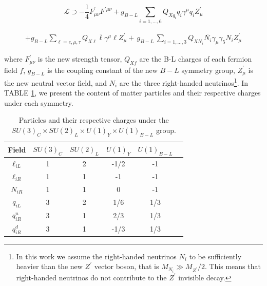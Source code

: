 \documentclass[aps,prev,twocolumn,preprintnumbers,floatfix,nofootinbib]{revtex4-1}
\renewcommand{\bar}{\overline}
\begin{document}
%

\begin{equation*}
    \mathcal{L}\supset -\frac{1}{4}{F}^{\prime}_{\mu\nu}{F}^{'\mu\nu} + {g}_{B-L}\sum_{i=1,...,6} {Q}_{X{q}_{i}} \overline{q_{i}} {\gamma}^{\mu} q_{i} {Z}^{\prime}_{\mu}
\end{equation*}

\begin{align}
 +{g}_{B-L}\sum_{\ell=e,\mu,\tau} {Q}_{X\ell} \overline{\ell} {\gamma}^{\mu} \ell {Z}^{\prime}_{\mu}  + \, g_{B-L}\,\sum_{i=1,...,3} {Q}_{X{N}_{i}} \bar{N_i} \gamma_\mu \gamma_5 N_i {Z}^{\prime}_{\mu}
    \label{relevant_lagrangian}    
\end{align}

\noindent where $F^{\prime}_{\mu\nu}$ is the new strength tensor, $Q_{Xf}$ are the B-L charges of each fermion field $f$, $g_{B-L}$ is the coupling constant of the new $B-L$ symmetry group, ${Z}^{\prime}_{\mu}$ is the new neutral vector field, and ${N}_{i}$ are the three right-handed neutrinos\footnote{In this work we assume the right-handed neutrinos ${N}_{i}$ to be sufficiently heavier than the new ${Z}^{\prime}$ vector boson, that is ${M}_{{N}_{i}} \gg {M}_{{Z}^{\prime}}/2$. This means that right-handed neutrinos do not contribute to the ${Z}^{\prime}$ invisible decay.}. In TABLE \ref{table1}, we present the content of matter particles and their respective charges under each symmetry. 

\begin{table}[h]
\begin{tabular}{|c|c|c|c|c|c|}
\hline
Field & $SU(3)_{C}$ & $SU(2)_{L}$ & $U(1)_{Y}$ & $U(1)_{B-L}$  \\ \hline
 ${\ell}_{iL}$ & 1 & 2 & -1/2 & -1  \\ \hline
 ${\ell}_{iR}$ & 1 & 1 & -1 & -1  \\ \hline
 ${N}_{iR}$ & 1 & 1 & 0 & -1 \\ \hline
 ${q}_{iL}$ & 3 & 2 & 1/6 & 1/3  \\ \hline
 ${q}^{u}_{iR}$ & 3 & 1 & 2/3 & 1/3  \\ \hline
 ${q}^{d}_{iR}$ & 3 & 1 & -1/3 & 1/3  \\ \hline
\end{tabular}
\caption{Particles and their respective charges under the $SU(3)_{C} \times SU(2)_{L} \times U(1)_{Y} \times U(1)_{B-L}$ group.}
\label{table1}
\end{table}
\end{document}
